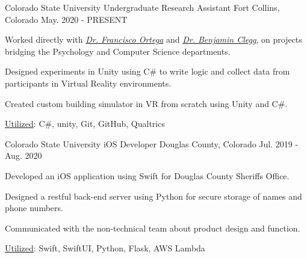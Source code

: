 

\begin{cventries}

  \cventry
    {Colorado State University} %
    {Undergraduate Research Assistant} %
    {Fort Collins, Colorado} %
    {May. 2020 - PRESENT} %
    {
      \begin{cvitems} %
        \item {Worked directly with \textit{\href{https://compsci.colostate.edu/person/?id=22550A7530193FD205613DD09DD2EE6F&sq=t}{Dr. Francisco Ortega}} and \textit{\href{http://psywebserv.psych.colostate.edu/psylist/detail.asp?Num=15}{Dr. Benjamin Clegg}}, on projects bridging the Psychology and Computer Science departments.}
        \item {Designed experiments in Unity using C\# to write logic and collect data from participants  in Virtual Reality environments.}
        \item {Created custom building simulator in VR from scratch using Unity and C\#.}
        \item {\underline{Utilized}:  C\#, unity,  Git,  GitHub,  Qualtrics}
      \end{cvitems}
    }

  \cventry
    {Colorado State University} %
    {iOS Developer} %
    {Douglas County, Colorado} %
    {Jul. 2019 - Aug. 2020} %
    {
      \begin{cvitems} %
        \item {Developed an iOS  application using Swift for Douglas County Sheriffs Office.}
        \item {Designed a restful  back-end server using Python for secure storage of names and phone numbers.}
        \item {Communicated with the non-technical team about product design and function.}
        \item {\underline{Utilized}:  Swift, SwiftUI,  Python, Flask, AWS Lambda}
      \end{cvitems}
    }


\end{cventries}

